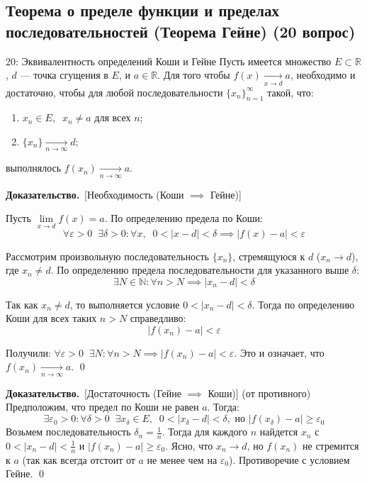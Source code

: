 \documentclass[a4paper,12pt]{article}
\newcommand{\myproof}{\textbf{Доказательство.}\ }
\begin{document}
	\subsection{Теорема о пределе функции и пределах последовательностей (Теорема Гейне) (20 вопрос)}
	
	\begin{theorembox}{20: Эквивалентность определений Коши и Гейне}
		Пусть имеется множество $E \subset \mathbb{R}$, $d$ --- точка сгущения в $E$, и $a \in \mathbb{R}$. Для того чтобы $f(x) \xrightarrow[x \to d]{} a$, необходимо и достаточно, чтобы для любой последовательности $\{x_n\}_{n=1}^{\infty}$ такой, что:
		\begin{enumerate}
			\item $x_n \in E, \;\; x_n \neq a$ для всех $n$;
			\item $\{x_n\} \xrightarrow[n \to \infty]{} d$;
		\end{enumerate}
		выполнялось $f(x_n) \xrightarrow[n \to \infty]{} a$.
	\end{theorembox}
	
	\vspace{0.5cm}
	\myproof[Необходимость (Коши $\implies$ Гейне)]
	
	Пусть $\lim\limits_{x \to d} f(x) = a$. По определению предела по Коши:
	\[ \forall \varepsilon > 0 \;\; \exists \delta > 0 \colon \forall x, \;\; 0 < |x - d| < \delta \implies |f(x) - a| < \varepsilon \]
	
	Рассмотрим произвольную последовательность $\{x_n\}$, стремящуюся к $d$ ($x_n \to d$), где $x_n \neq d$. По определению предела последовательности для указанного выше $\delta$:
	\[ \exists N \in \mathbb{N} \colon \forall n > N \implies |x_n - d| < \delta \]
	
	Так как $x_n \neq d$, то выполняется условие $0 < |x_n - d| < \delta$. Тогда по определению Коши для всех таких $n > N$ справедливо:
	\[ |f(x_n) - a| < \varepsilon \]
	
	Получили: $\forall \varepsilon > 0 \;\; \exists N \colon \forall n > N \implies |f(x_n) - a| < \varepsilon$.
	Это и означает, что $f(x_n) \xrightarrow[n \to \infty]{} a$. \qed
	
	\vspace{0.5cm}
	\myproof[Достаточность (Гейне $\implies$ Коши)] (от противного)
	Предположим, что предел по Коши не равен $a$. Тогда:
	\[ \exists \varepsilon_0 > 0 \colon \forall \delta > 0 \;\; \exists x_\delta \in E, \;\; 0 < |x_\delta - d| < \delta, \text{ но } |f(x_\delta) - a| \ge \varepsilon_0 \]
	Возьмем последовательность $\delta_n = \frac{1}{n}$. Тогда для каждого $n$ найдется $x_n$ с $0 < |x_n - d| < \frac{1}{n}$ и $|f(x_n) - a| \ge \varepsilon_0$.
	Ясно, что $x_n \to d$, но $f(x_n)$ не стремится к $a$ (так как всегда отстоит от $a$ не менее чем на $\varepsilon_0$). Противоречие с условием Гейне. \qed
	
\end{document}

